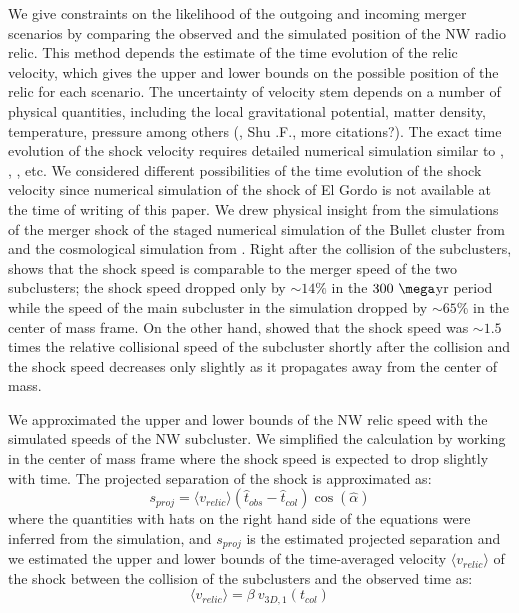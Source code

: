 We give constraints on the likelihood of the
outgoing and incoming merger scenarios by comparing the observed and the
simulated position of the NW radio relic.
This method depends the estimate of the
time evolution of the relic velocity, which gives the upper and lower
bounds on the possible position of the relic for each scenario. The
uncertainty of velocity stem depends on a number of physical quantities, including the
local gravitational potential, matter density, temperature, pressure among
others (\citealt{E98}, Shu .F., more citations?).  The exact time evolution
of the shock velocity requires detailed numerical simulation similar to
\citet{Springel2007}, \citet{Vazza11}, \citet{Kang2007}, etc.  
We considered different possibilities of the time evolution of the shock
velocity since numerical simulation of the shock of El Gordo is not
available at the time of writing of this paper. We drew physical insight from the simulations of the merger shock of the
staged numerical simulation of the Bullet cluster from \citet{Springel2007}
and the cosmological simulation from \citet{Paul2011b}. Right after
the collision of the subclusters, \citet{Springel2007} shows that the shock speed is
comparable to the merger speed of the two subclusters; the shock speed
dropped only by $\sim 14\%$ in the $300~\mega$yr period while the speed of
the main subcluster in the simulation dropped by $\sim65\%$ in the center
of mass frame. On the other hand, \citet{Paul2011b} showed that the shock
speed was $\sim1.5$ times the relative collisional speed of the subcluster
shortly after the collision and the shock speed decreases only
slightly as it propagates away from the center of mass. \par  
We approximated the upper and lower bounds of the NW relic speed with the
simulated speeds of the NW subcluster.  We simplified the calculation by
working in the center of mass frame where the shock speed is expected to
drop slightly with time. 
The projected separation of the shock is approximated as:
\begin{equation}
	s_{proj} = \langle v_{relic} \rangle (\hat{t}_{obs} - \hat{t}_{col}) \cos(\hat{\alpha})
\end{equation}
where the quantities with hats on the right hand side of the equations were
inferred from the simulation, and $s_{proj}$ is the estimated projected separation and we estimated the
upper and lower bounds of the time-averaged velocity
$\langle v_{relic} \rangle$ of the shock between
the collision of the subclusters and the observed time as:  
\begin{equation}
	\langle v_{relic} \rangle = \beta~v_{3D,1}(t_{col})  
\end{equation}
